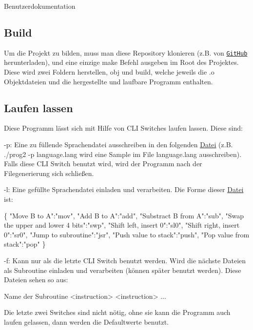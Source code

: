 Benutzerdokumentation

\subsection*{Build}

Um die Projekt zu bilden, muss man diese Repository klonieren (z.\+B. von \href{https://github.com/leventeBajczi/prog2-gha/}{\tt Git\+Hub} herunterladen), und eine einzige {\ttfamily make} Befehl ausgeben im Root des Projektes. Diese wird zwei Foldern herstellen, {\ttfamily obj} und {\ttfamily build}, welche jeweils die .o Objektdateien und die hergestellte und laufbare Programm enthalten.

\subsection*{Laufen lassen}

Diese Programm lässt sich mit Hilfe von C\+LI Switches laufen lassen. Diese sind\+:
\begin{DoxyItemize}
\item {\ttfamily -\/p}\+: Eine zu füllende Sprachendatei ausschreiben in den folgenden \mbox{\hyperlink{class_datei}{Datei}} (z.\+B. {\ttfamily ./prog2 -\/p language.\+lang} wird eine Sample im File {\ttfamily language.\+lang} ausschreiben). Falls diese C\+LI Switch benutzt wird, wird der Programm nach der Filegenerierung sich schließen.
\item {\ttfamily -\/l}\+: Eine gefüllte Sprachendatei einladen und verarbeiten. Die Forme dieser \mbox{\hyperlink{class_datei}{Datei}} ist\+: 
\begin{DoxyCode}
\{
"Move B to A":"mov",
"Add B to A":"add",
"Substract B from A":"sub",
"Swap the upper and lower 4 bits":"swp",
"Shift left, insert 0":"sl0",
"Shift right, insert 0":"sr0",
"Jump to subroutine":"jsr",
"Push value to stack":"push",
"Pop value from stack":"pop"
\}
\end{DoxyCode}

\item {\ttfamily -\/f}\+: Kann nur als die letzte C\+LI Switch benutzt werden. Wird die nächste Dateien als Subroutine einladen und verarbeiten (können später benutzt werden). Diese Dateien sehen so aus\+: 
\begin{DoxyCode}
Name der Subroutine
<instruction>
<instruction>
...
\end{DoxyCode}
 Die letzte zwei Switches sind nicht nötig, ohne sie kann die Programm auch laufen gelassen, dann werden die Defaultwerte benutzt.
\end{DoxyItemize}

